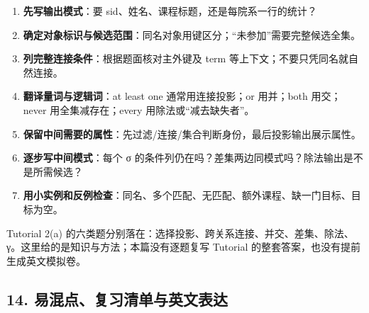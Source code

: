 \begin{enumerate}
\def\labelenumi{\arabic{enumi}.}
\tightlist
\item
  \textbf{先写输出模式}：要 sid、姓名、课程标题，还是每院系一行的统计？
\item
  \textbf{确定对象标识与候选范围}：同名对象用键区分；``未参加''需要完整候选全集。
\item
  \textbf{列完整连接条件}：根据题面核对主外键及 term 等上下文；不要只凭同名就自然连接。
\item
  \textbf{翻译量词与逻辑词}：at least one 通常用连接投影；or 用并；both 用交；never 用全集减存在；every 用除法或``减去缺失者''。
\item
  \textbf{保留中间需要的属性}：先过滤/连接/集合判断身份，最后投影输出展示属性。
\item
  \textbf{逐步写中间模式}：每个 σ 的条件列仍在吗？差集两边同模式吗？除法输出是不是所需候选？
\item
  \textbf{用小实例和反例检查}：同名、多个匹配、无匹配、额外课程、缺一门目标、目标为空。
\end{enumerate}

Tutorial 2(a) 的六类题分别落在：选择投影、跨关系连接、并交、差集、除法、γ。这里给的是知识与方法；本篇没有逐题复写 Tutorial 的整套答案，也没有提前生成英文模拟卷。

\subsection{14. 易混点、复习清单与英文表达}\label{05_relational_algebra_zh-ux6613ux6df7ux70b9ux590dux4e60ux6e05ux5355ux4e0eux82f1ux6587ux8868ux8fbe}

